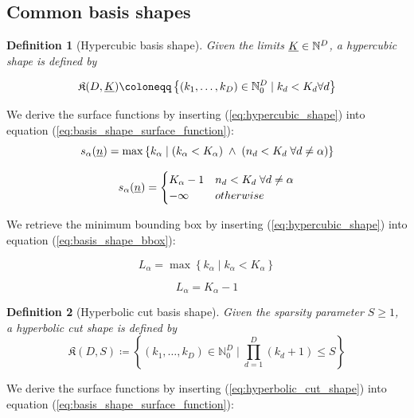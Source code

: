 \documentclass{article}
\newtheorem{definition}{Definition}
\begin{document}
\subsection{Common basis shapes}
\begin{definition}[Hypercubic basis shape]
  Given the limits \(\underline{K} \in \mathbb{N}^D\), a hypercubic shape is defined by

  \begin{equation}
    \label{eq:hypercubic_shape}
    \mathfrak{K}(D,\mindex{K}) \coloneqq \left\{(k_1,\dots,k_D) \in \mathbb{N}_0^D \;|\; k_d < K_d \forall d\right\}
  \end{equation}
\end{definition}

We derive the surface functions by inserting (\ref{eq:hypercubic_shape}) into
equation
(\ref{eq:basis_shape_surface_function}):
\[
  s_{\alpha}(\underline{n})=\max\left\{k_{\alpha} \mid (k_{\alpha}<K_{\alpha}) \;\land\;
    (n_d < K_d \;\forall d \neq \alpha)\right\}
\]

\begin{equation}
  s_{\alpha}(\underline{n})=
  \begin{cases}
    K_{\alpha}-1 & n_d < K_d \;\forall d \neq \alpha \\
    -\infty & otherwise \\
  \end{cases}
\end{equation}

We retrieve the minimum bounding box by inserting (\ref{eq:hypercubic_shape}) into
equation
(\ref{eq:basis_shape_bbox}):

\[
L_{\alpha}=\max\left\{k_{\alpha} \mid k_{\alpha}<K_{\alpha}\right\}
\]

\begin{equation}
L_{\alpha}=K_{\alpha}-1
\end{equation}

\begin{definition}[Hyperbolic cut basis shape]
  Given the sparsity parameter \(S \geq 1\), a hyperbolic cut shape is defined by
  \begin{equation}
    \mathfrak{K}(D,S) \coloneqq \left\{(k_1,\dots,k_D) \in \mathbb{N}_0^D \;|\;\prod_{d=1}^D(k_d+1) \leq S\right\}
    \label{eq:hyperbolic_cut_shape}
  \end{equation}
\end{definition}

We derive the surface functions by inserting (\ref{eq:hyperbolic_cut_shape}) into
equation (\ref{eq:basis_shape_surface_function}):
\end{document}
